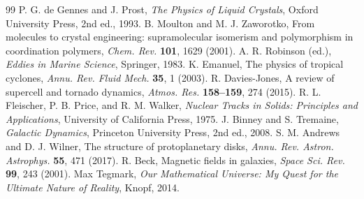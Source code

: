 \documentclass[11pt,a4paper]{article}
\begin{document}
\begin{thebibliography}{99}
		P. G. de Gennes and J. Prost, \emph{The Physics of Liquid Crystals}, Oxford University Press, 2nd ed., 1993.
		B. Moulton and M. J. Zaworotko, From molecules to crystal engineering: supramolecular isomerism and polymorphism in coordination polymers, \emph{Chem. Rev.} \textbf{101}, 1629 (2001).
		A. R. Robinson (ed.), \emph{Eddies in Marine Science}, Springer, 1983.
		K. Emanuel, The physics of tropical cyclones, \emph{Annu. Rev. Fluid Mech.} \textbf{35}, 1 (2003).
		R. Davies-Jones, A review of supercell and tornado dynamics, \emph{Atmos. Res.} \textbf{158--159}, 274 (2015).
		R. L. Fleischer, P. B. Price, and R. M. Walker, \emph{Nuclear Tracks in Solids: Principles and Applications}, University of California Press, 1975.
		J. Binney and S. Tremaine, \emph{Galactic Dynamics}, Princeton University Press, 2nd ed., 2008.
		S. M. Andrews and D. J. Wilner, The structure of protoplanetary disks, \emph{Annu. Rev. Astron. Astrophys.} \textbf{55}, 471 (2017).
		R. Beck, Magnetic fields in galaxies, \emph{Space Sci. Rev.} \textbf{99}, 243 (2001).
		Max Tegmark, \emph{Our Mathematical Universe: My Quest for the Ultimate Nature of Reality}, Knopf, 2014.
	\end{thebibliography}
	
\end{document}
